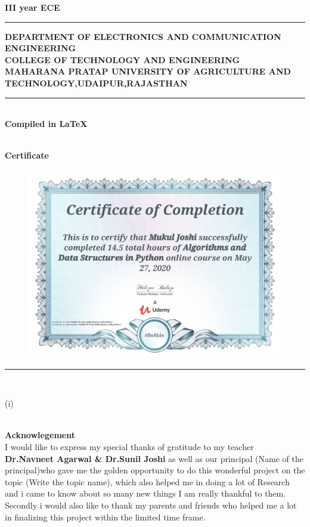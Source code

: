 \documentclass[a4paper,12pt]{report}
\begin{document}
\vspace{1.5cm}
\textbf{III year ECE}\\[0.5cm]
\rule{\textwidth}{0.3mm}
\begin{center}
	\textbf{DEPARTMENT OF ELECTRONICS AND COMMUNICATION ENGINEERING}\\[0.0cm]
	\large{\color{black}\textbf{COLLEGE OF TECHNOLOGY AND ENGINEERING}}\\
	\textbf{\scriptsize{MAHARANA PRATAP UNIVERSITY OF AGRICULTURE AND
	TECHNOLOGY,UDAIPUR,RAJASTHAN}}
	\rule{\textwidth}{0.3mm}\\[0.19cm]
	\color{three}\textbf{Compiled in \LaTeX}
\end{center}
\thispagestyle{empty}
\begin{center}
\thispagestyle{empty}
	\textbf{ }\\[5cm]
\textbf{\LARGE{Certificate}}\\
\begin{figure}[h]
	\includegraphics[scale=0.3]{udemy.jpg}
\end{figure}
\end{center}
	\rule{16cm}{0.5mm}\\[8.3cm]
	\begin{center}
		\textrm{(i)}
	\end{center}
\newpage

\begin{center}
\thispagestyle{empty}
	\textbf{ } \\[4cm]
	\textbf{\LARGE{Acknowlegement}}\\[1cm]
	\Large{I would like to express my special thanks of gratitude to my teacher
	\textbf{Dr.Navneet Agarwal & Dr.Sunil Joshi} as well as our principal (Name of the principal)who gave me the golden opportunity to do this wonderful project on the topic (Write the topic name), which also helped me in doing a lot of Research and i came to know about so many new things I am really thankful to them.
Secondly i would also like to thank my parents and friends who helped me a lot
	in finalizing this project within the limited time frame.}
\end{center}
\end{document}
